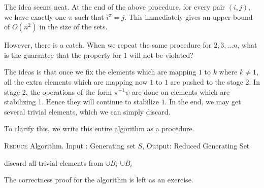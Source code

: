The idea seems neat. At the end of the above procedure, for every pair $(i,j)$, we have exactly one $\pi$ such that $i^{\pi} = j$. This immediately gives an upper bound of $O(n^2)$ in the size of the sets.

However, there is a catch. When we repeat the same procedure for $2,3, \ldots n$, what is the guarantee that the property for $1$ will not be violated?

The ideas is that once we fix the elements which are mapping $1$ to $k$ where $k \ne 1$, all the extra elements which are mapping now $1$ to $1$ are pushed to the stage 2. In stage 2, the operations of the form $\pi^{-1} \psi$ are done on elements which are stabilizing 1. Hence they will continue to stabilize $1$. In the end, we may get several trivial elements, which we can simply discard.

To clarify this, we write this entire algorithm as a procedure.

\begin{algorithm}
\caption{\textsc{Reduce} Algorithm. Input : Generating set $S$, Output: Reduced Generating Set}
\label{alg:reduce}
\begin{algorithmic}[1]
\Else
{}
\EndIf
\Else
{}
\EndIf
\EndFor
\EndFor
\State discard all trivial elements from $\cup B_i$
 $\cup B_i$
\end{algorithmic}
\end{algorithm}
The correctness proof for the algorithm is left as an exercise.
